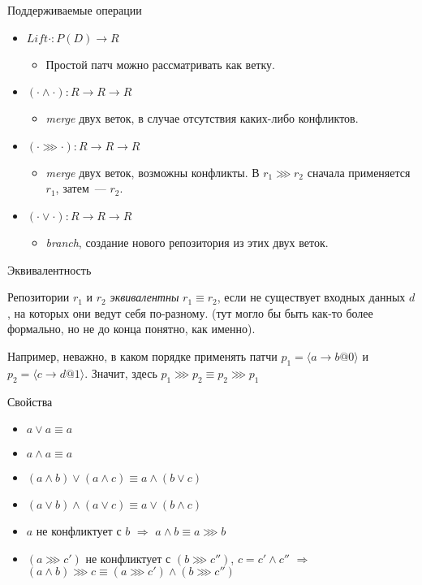 \begin{frame}{Поддерживаемые операции}
  \begin{itemize}
  \item $Lift \cdot : P(D) \to R$
    \begin{itemize}
    \item Простой патч можно рассматривать как ветку.
    \end{itemize}
  \item $(\cdot \wedge \cdot) : R \to R \to R$
    \begin{itemize}
    \item \emph{merge} двух веток, в случае отсутствия каких-либо конфликтов.
    \end{itemize}
  \item $(\cdot \ggg \cdot) : R \to R \to R$
    \begin{itemize}
    \item \emph{merge} двух веток, возможны конфликты. В $r_1 \ggg r_2$
      сначала применяется $r_1$, затем~--- $r_2$.
    \end{itemize}
  \item $(\cdot \vee \cdot) : R \to R \to R$
    \begin{itemize}
    \item \emph{branch}, создание нового репозитория из этих двух веток.
    \end{itemize}
  \end{itemize}
\end{frame}

\begin{frame}{Эквивалентность}
  \begin{definition}
    Репозитории $r_1$ и $r_2$ \emph{эквивалентны} $r_1 \equiv r_2$,
    если не существует входных данных $d$, на которых они ведут себя
    по-разному. (тут могло бы быть как-то более формально, но не до
    конца понятно, как именно).
  \end{definition}
  
  Например, неважно, в каком порядке применять патчи $p_1 = \langle a
  \to b @ 0\rangle$ и $p_2 = \langle c \to d @ 1\rangle$. Значит,
  здесь $p_1 \ggg p_2 \equiv p_2 \ggg p_1$
\end{frame}

\begin{frame}{Свойства}
  \begin{itemize}
  \item $a \vee a \equiv a$
  \item $a \wedge a \equiv a$
  \item $(a \wedge b) \vee (a \wedge c) \equiv a \wedge (b \vee c)$
  \item $(a \vee b) \wedge (a \vee c) \equiv a \vee (b \wedge c)$
  \item $a$ не конфликтует с $b$ $\Rightarrow$ $a \wedge b \equiv a
    \ggg b$
  \item $(a \ggg c')$ не конфликтует с $(b \ggg c'')$, $c = c' \wedge
    c''$ $\Rightarrow$ $(a \wedge b) \ggg c \equiv (a \ggg c') \wedge
    (b \ggg c'')$
  \end{itemize}
\end{frame}


